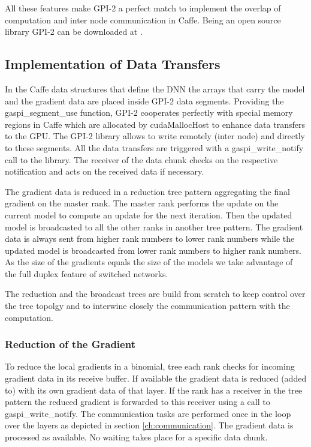 \documentclass[twoside,twocolumn]{article}
\begin{document}
All these features make GPI-2 a perfect match to implement the
overlap of computation and inter node communication in Caffe. Being an open source
library GPI-2 can be downloaded at \cite{gpi2}.

\subsection{Implementation of Data Transfers}

In the Caffe data structures that define the DNN the arrays that carry
the model and the gradient data are placed inside  GPI-2 data segments.
Providing the gaspi\_segment\_use function, GPI-2 cooperates
perfectly with special memory regions in Caffe which are 
allocated by cudaMallocHost to enhance data transfers to the GPU.
The GPI-2 library allows to write remotely (inter node) and directly  to these
segments.
All the data transfers are triggered with a gaspi\_write\_notify
call to the library. The receiver of the data chunk checks on the
respective notification and acts on the received data if necessary.

The gradient data is reduced in a reduction tree pattern aggregating
the final gradient on the master rank. The master rank performs the
update on the current model to compute an update for the next iteration.
Then the updated model is broadcasted to all the other ranks in another
tree pattern. The gradient data is always sent from higher rank numbers to lower rank numbers
while the updated model is broadcasted from lower rank
numbers to higher rank numbers. As the size of the gradients equals the size of
the models we take advantage of the full duplex feature of switched networks.

The reduction and the broadcast trees are build from scratch to
keep control over the tree topolgy and to interwine
closely the communication pattern with the computation.

\subsubsection{Reduction of the Gradient}
To reduce the local gradients in a binomial, tree each rank checks for incoming
gradient data in its receive buffer.
If available the gradient data is reduced (added to) with its own
gradient data of that layer. If the rank has a receiver in the tree pattern
the reduced gradient is forwarded to this receiver using a call
to  gaspi\_write\_notify. The communication
tasks are performed once in the loop over the layers as 
depicted in section \ref{ch:communication}. The gradient data is processed
as available. No waiting takes place for a specific data chunk.
\end{document}
